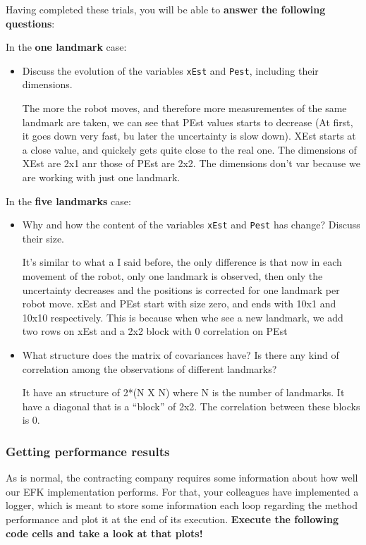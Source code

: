 \documentclass[11pt]{article}
\begin{document}
Having completed these trials, you will be able to \textbf{answer the
following questions}:

In the \textbf{one landmark} case:

\begin{itemize}
\item
  Discuss the evolution of the variables \texttt{xEst} and
  \texttt{Pest}, including their dimensions.

  The more the robot moves, and therefore more measurementes of the same
  landmark are taken, we can see that PEst values starts to decrease (At
  first, it goes down very fast, bu later the uncertainty is slow down).
  XEst starts at a close value, and quickely gets quite close to the
  real one. The dimensions of XEst are 2x1 anr those of PEst are 2x2.
  The dimensions don't var because we are working with just one
  landmark.
\end{itemize}

In the \textbf{five landmarks} case:

\begin{itemize}
\item
  Why and how the content of the variables \texttt{xEst} and
  \texttt{Pest} has change? Discuss their size.

  It's similar to what a I said before, the only difference is that now
  in each movement of the robot, only one landmark is observed, then
  only the uncertainty decreases and the positions is corrected for one
  landmark per robot move. xEst and PEst start with size zero, and ends
  with 10x1 and 10x10 respectively. This is because when whe see a new
  landmark, we add two rows on xEst and a 2x2 block with 0 correlation
  on PEst
\item
  What structure does the matrix of covariances have? Is there any kind
  of correlation among the observations of different landmarks?

  It have an structure of 2*(N X N) where N is the number of landmarks.
  It have a diagonal that is a ``block'' of 2x2. The correlation between
  these blocks is 0.
\end{itemize}

    \hypertarget{getting-performance-results}{%
\subsubsection{Getting performance
results}\label{getting-performance-results}}

As is normal, the contracting company requires some information about
how well our EFK implementation performs. For that, your colleagues have
implemented a logger, which is meant to store some information each loop
regarding the method performance and plot it at the end of its
execution. \textbf{Execute the following code cells and take a look at
that plots!}
\end{document}
